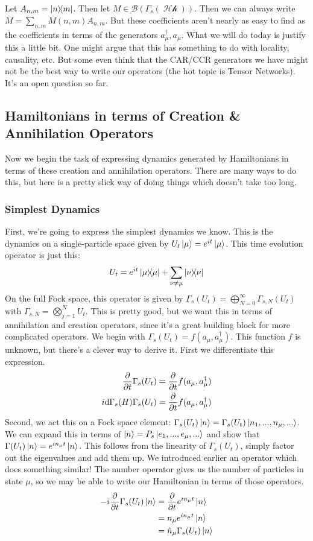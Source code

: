 \documentclass{article}
\DeclareMathOperator{\Hh}{\mathcal{Hh}}
\begin{document}
Let $A_{n,m} = \dyad{n}{m}$. Then let $M \in \mathcal{B}(\Gamma_s(\Hh))$. Then we can always write $M = \sum_{n,m} M(n,m) A_{n,m}$. But these coefficients aren't nearly as easy to find as the coefficients in terms of the generators $a_\mu^\dagger, a_\mu$. What we will do today is justify this a little bit. One might argue that this has something to do with locality, causality, etc. But some even think that the CAR/CCR generators we have might not be the best way to write our operators (the hot topic is Tensor Networks). It's an open question so far.

\subsection{Hamiltonians in terms of Creation \& Annihilation Operators}
Now we begin the task of expressing dynamics generated by Hamiltonians in terms of these creation and annihilation operators. There are many ways to do this, but here is a pretty slick way of doing things which doesn't take too long.

\subsubsection{Simplest Dynamics}
First, we're going to express the simplest dynamics we know. This is the dynamics on a single-particle space given by $U_t \ket{\mu} = e^{it}\ket{\mu}$. This time evolution operator is just this: \[U_t = e^{it}\dyad{\mu}+\sum_{\nu\neq\mu}\dyad{\nu}\]
On the full Fock space, this operator is given by $\Gamma_s(U_t) = \bigoplus_{N=0}^\infty \Gamma_{s,N}(U_t)$ with $\Gamma_{s,N} = \bigotimes_{j=1}^N U_t$. This is pretty good, but we want this in terms of annihilation and creation operators, since it's a great building block for more complicated operators. We begin with $\Gamma_s(U_t) = f(a_\mu,a_\mu^\dagger)$. This function $f$ is unknown, but there's a clever way to derive it. First we differentiate this expression.
\begin{align}
\pdv{t} \Gamma_s(U_t) &= \pdv{t}f(a_\mu,a_\mu^\dagger)\\
i\dd\Gamma_s(H)\Gamma_s(U_t) &= \pdv{t}f(a_\mu,a_\mu^\dagger)
\end{align}
Second, we act this on a Fock space element: $\Gamma_s(U_t)\ket{n} = \Gamma_s(U_t) \ket{n_1,...,n_\mu,...}$. We can expand this in terms of $\ket{n} = P_s\ket{e_1,...,e_\mu,...}$ and show that $\Gamma(U_t)\ket{n} = e^{in_\mu t} \ket{n}$. This follows from the linearity of $\Gamma_s(U_t)$, simply factor out the eigenvalues and add them up. We introduced earlier an operator which does something similar! The number operator gives us the number of particles in state $\mu$, so we may be able to write our Hamiltonian in terms of those operators.
\begin{align}
-i\pdv{t}\Gamma_s(U_t)\ket{n} &= \pdv{t} e^{in_\mu t}\ket{n}\\
&=n_\mu e^{in_\mu t}\ket{n}\\
&= \hat n_\mu \Gamma_s(U_t)\ket{n}
\end{align}
\end{document}
